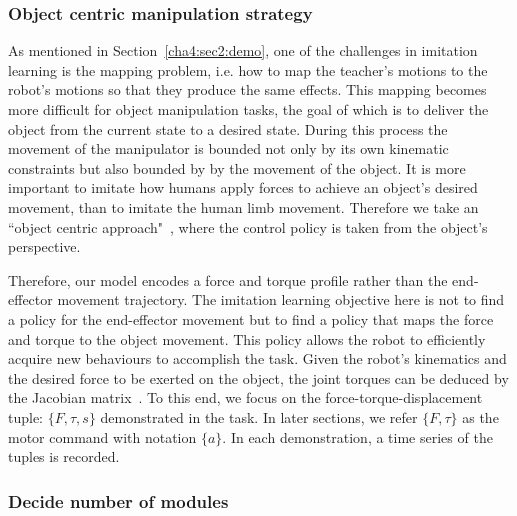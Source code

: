%
%



\subsubsection{Object centric manipulation strategy}
\label{cha4:sec2:learn:objectlevel}


As mentioned in Section~\ref{cha4:sec2:demo}, one of the challenges in imitation learning is the mapping problem, i.e. how to map the teacher's motions to the robot's motions so that they produce the same effects. This mapping becomes more difficult for object manipulation tasks, the goal of which is to deliver the object from the current state to a desired state. During this process the movement of the manipulator is bounded not only by its own kinematic constraints but also bounded by by the movement of the object. It is more important to imitate how humans apply forces to achieve an object's desired movement, than to imitate the human limb movement.
Therefore we take an ``object centric approach"~\cite{okamura2000overview}, where the control policy is taken from the object's perspective.


Therefore, our model encodes a force and torque profile rather than the end-effector movement trajectory. The imitation learning objective here is not to find a policy for the end-effector movement but to find a policy that maps the force and torque to the object movement. This policy allows the robot to efficiently acquire new behaviours to accomplish the task. %
Given the robot's kinematics and the desired force to be exerted on the object, the joint torques can be deduced by the Jacobian matrix~\cite{okamura2000overview}. To this end, we focus on the force-torque-displacement tuple: $\{F,\tau,s\}$ demonstrated in the task. In later sections, we refer $\{F,\tau\}$ as the motor command with notation $\{a\}$. In each demonstration, a time series of the tuples is recorded.



\subsubsection{Decide number of modules}
\label{cha4:sec2:learn:cluster}


